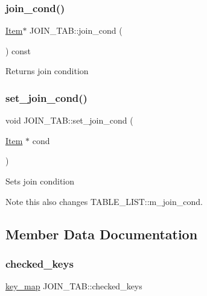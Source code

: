 \subsubsection{\texorpdfstring{join\+\_\+cond()}{join\_cond()}}
{\footnotesize\ttfamily \mbox{\hyperlink{classItem}{Item}}$\ast$ J\+O\+I\+N\+\_\+\+T\+A\+B\+::join\+\_\+cond (\begin{DoxyParamCaption}{ }\end{DoxyParamCaption}) const\hspace{0.3cm}{\ttfamily [inline]}}

\begin{DoxyReturn}{Returns}
join condition 
\end{DoxyReturn}
\mbox{\label{classJOIN__TAB_a883f00d9645b34b6a19785d8833013ff}} 
\subsubsection{\texorpdfstring{set\+\_\+join\+\_\+cond()}{set\_join\_cond()}}
{\footnotesize\ttfamily void J\+O\+I\+N\+\_\+\+T\+A\+B\+::set\+\_\+join\+\_\+cond (\begin{DoxyParamCaption}\item[{\mbox{\hyperlink{classItem}{Item}} $\ast$}]{cond }\end{DoxyParamCaption})\hspace{0.3cm}{\ttfamily [inline]}}

Sets join condition \begin{DoxyNote}{Note}
this also changes T\+A\+B\+L\+E\+\_\+\+L\+I\+S\+T\+::m\+\_\+join\+\_\+cond. 
\end{DoxyNote}


\subsection{Member Data Documentation}
\mbox{\label{classJOIN__TAB_a31d607e637a6ef4a70b06c9e73be9247}} 
\subsubsection{\texorpdfstring{checked\+\_\+keys}{checked\_keys}}
{\footnotesize\ttfamily \mbox{\hyperlink{classBitmap_3_0164_01_4}{key\+\_\+map}} J\+O\+I\+N\+\_\+\+T\+A\+B\+::checked\+\_\+keys}

